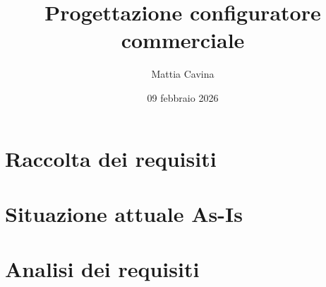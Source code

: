 \documentclass[12pt, a4paper]{article}
\title{Progettazione configuratore commerciale}
\author{Mattia Cavina}
\date{09 febbraio 2026}
\begin{document}
\maketitle
\newpage

\tableofcontents

\section{Raccolta dei requisiti}


\section{Situazione attuale As-Is}


\section{Analisi dei requisiti}



%
\end{document}
